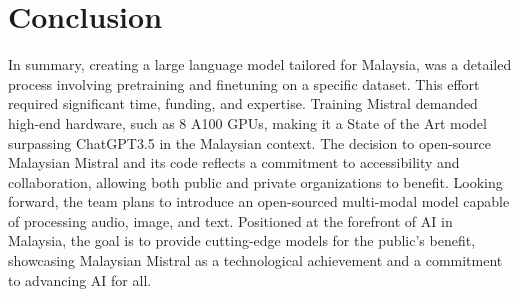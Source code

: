 \documentclass[preprint]{article}
\begin{document}
\section{Conclusion}

In summary, creating a large language model tailored for Malaysia, was a detailed process involving pretraining and finetuning on a specific dataset. This effort required significant time, funding, and expertise. Training Mistral demanded high-end hardware, such as 8 A100 GPUs, making it a State of the Art model surpassing ChatGPT3.5 in the Malaysian context. The decision to open-source Malaysian Mistral and its code reflects a commitment to accessibility and collaboration, allowing both public and private organizations to benefit. Looking forward, the team plans to introduce an open-sourced multi-modal model capable of processing audio, image, and text. Positioned at the forefront of AI in Malaysia, the goal is to provide cutting-edge models for the public's benefit, showcasing Malaysian Mistral as a technological achievement and a commitment to advancing AI for all.

{}

\end{document}
